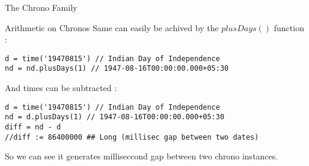 \begin{section}{The Chrono Family}
\begin{subsection}{Arithmetic on Chronos}
Same can easily be achived by the $plusDays()$ function :

\begin{lstlisting}[style=JexlStyle]
d = time('19470815') // Indian Day of Independence  
nd = nd.plusDays(1) // 1947-08-16T00:00:00.000+05:30 
\end{lstlisting}

And times can be subtracted :

\begin{lstlisting}[style=JexlStyle]
d = time('19470815') // Indian Day of Independence  
nd = d.plusDays(1) // 1947-08-16T00:00:00.000+05:30 
diff = nd - d 
//diff := 86400000 ## Long (millisec gap between two dates)
\end{lstlisting}

So we can see it generates milliseccond gap between two chrono instances.

\end{subsection}

\end{section}

